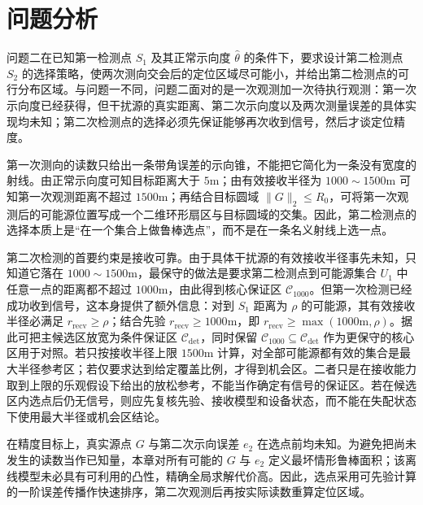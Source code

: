 
\section{问题分析}

问题二在已知第一检测点 $S_1$ 及其正常示向度 $\hat\theta$ 的条件下，要求设计第二检测点 $S_2$ 的选择策略，使两次测向交会后的定位区域尽可能小，并给出第二检测点的可行分布区域。与问题一不同，问题二面对的是一次观测加一次待执行观测：第一次示向度已经获得，但干扰源的真实距离、第二次示向度以及两次测量误差的具体实现均未知；第二次检测点的选择必须先保证能够再次收到信号，然后才谈定位精度。

第一次测向的读数只给出一条带角误差的示向锥，不能把它简化为一条没有宽度的射线。由正常示向度可知目标距离大于 $5\mathrm{m}$；由有效接收半径为 $1000\sim1500\mathrm{m}$ 可知第一次观测距离不超过 $1500\mathrm{m}$；再结合目标圆域 $\lVert G\rVert_2\le R_0$，可将第一次观测后的可能源位置写成一个二维环形扇区与目标圆域的交集。因此，第二检测点的选择本质上是“在一个集合上做鲁棒选点”，而不是在一条名义射线上选一点。

第二次检测的首要约束是接收可靠。由于具体干扰源的有效接收半径事先未知，只知道它落在 $1000\sim1500\mathrm{m}$，最保守的做法是要求第二检测点到可能源集合 $U_1$ 中任意一点的距离都不超过 $1000\mathrm{m}$，由此得到核心保证区 $\mathcal C_{1000}$。但第一次检测已经成功收到信号，这本身提供了额外信息：对到 $S_1$ 距离为 $\rho$ 的可能源，其有效接收半径必满足 $r_{\mathrm{recv}}\ge\rho$；结合先验 $r_{\mathrm{recv}}\ge1000\mathrm{m}$，即 $r_{\mathrm{recv}}\ge\max(1000\mathrm{m},\rho)$。据此可把主候选区放宽为条件保证区 $\mathcal C_{\det}$，同时保留 $\mathcal C_{1000}\subseteq\mathcal C_{\det}$ 作为更保守的核心区用于对照。若只按接收半径上限 $1500\mathrm{m}$ 计算，对全部可能源都有效的集合是最大半径参考区；若仅要求达到给定覆盖比例，才得到机会区。二者只是在接收能力取到上限的乐观假设下给出的放松参考，不能当作确定有信号的保证区。若在候选区内选点后仍无信号，则应先复核先验、接收模型和设备状态，而不能在失配状态下使用最大半径或机会区结论。

在精度目标上，真实源点 $G$ 与第二次示向误差 $e_2$ 在选点前均未知。为避免把尚未发生的读数当作已知量，本章对所有可能的 $G$ 与 $e_2$ 定义最坏情形鲁棒面积；该离线模型未必具有可利用的凸性，精确全局求解代价高。因此，选点采用可先验计算的一阶误差传播作快速排序，第二次观测后再按实际读数重算定位区域。

